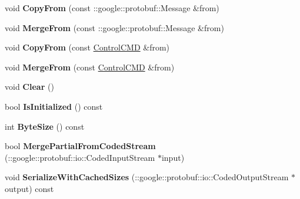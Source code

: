 \begin{DoxyCompactItemize}
\mbox{\label{classcontrol_data_1_1_control_c_m_d_aec240469b36503076655acc47fc2a943}} 
void {\bfseries Copy\+From} (const \+::google\+::protobuf\+::\+Message \&from)
\item 
\mbox{\label{classcontrol_data_1_1_control_c_m_d_ac9bd083764bf6242fbbc9af813d0a373}} 
void {\bfseries Merge\+From} (const \+::google\+::protobuf\+::\+Message \&from)
\item 
\mbox{\label{classcontrol_data_1_1_control_c_m_d_a74cefc73aaa3afc3da2f1f7fb22049a8}} 
void {\bfseries Copy\+From} (const \hyperlink{classcontrol_data_1_1_control_c_m_d}{Control\+C\+MD} \&from)
\item 
\mbox{\label{classcontrol_data_1_1_control_c_m_d_a17819ef7f8597f2d48801f4995f5fcd4}} 
void {\bfseries Merge\+From} (const \hyperlink{classcontrol_data_1_1_control_c_m_d}{Control\+C\+MD} \&from)
\item 
\mbox{\label{classcontrol_data_1_1_control_c_m_d_a624cd869518ba28a13b264d84adeb788}} 
void {\bfseries Clear} ()
\item 
\mbox{\label{classcontrol_data_1_1_control_c_m_d_aecd07e7e945e923d2bd262e0c9703caa}} 
bool {\bfseries Is\+Initialized} () const
\item 
\mbox{\label{classcontrol_data_1_1_control_c_m_d_a8f3ebc3199e2e0f465e6c66ae11b7883}} 
int {\bfseries Byte\+Size} () const
\item 
\mbox{\label{classcontrol_data_1_1_control_c_m_d_a920222ec44e8af75c405012eb2048891}} 
bool {\bfseries Merge\+Partial\+From\+Coded\+Stream} (\+::google\+::protobuf\+::io\+::\+Coded\+Input\+Stream $\ast$input)
\item 
\mbox{\label{classcontrol_data_1_1_control_c_m_d_aa85d8a9e1e66875ab37d6b9cb3d4ab30}} 
void {\bfseries Serialize\+With\+Cached\+Sizes} (\+::google\+::protobuf\+::io\+::\+Coded\+Output\+Stream $\ast$output) const

\end{DoxyCompactItemize}
